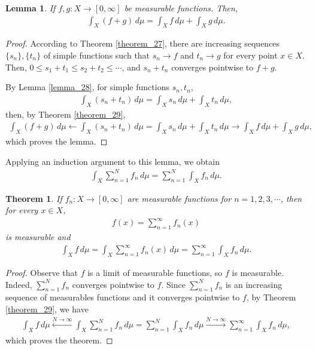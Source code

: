 \documentclass[11pt]{book}
\newtheorem{theorem}{Theorem}[chapter]
\newtheorem{lemma}{Lemma}[chapter]
\theoremstyle{definition}
\numberwithin{equation}{chapter}
\begin{document}
\begin{lemma}
If $f,g: X \to [0,\infty]$ be measurable functions. Then,
\begin{align*}
    \int_X (f + g)\,d\mu = \int_X f\,d\mu + \int_X g\,d\mu.
\end{align*}
\end{lemma}
\begin{proof}
According to Theorem \ref{theorem_27}, there are increasing sequences $\{s_n\}, \{t_n\}$ of simple functions such that $s_n \to f$ and $t_n \to g$ for every point $x \in X$. Then, $0 \leq s_1 + t_1 \leq s_2 + t_2 \leq \cdots$, and $s_n + t_n$ converges pointwise to $f + g$.

By Lemma \ref{lemma_28}, for simple functions $s_n, t_n$,
\begin{align*}
    \int_X(s_n + t_n)\,d\mu = \int_X s_n\,d\mu + \int_X t_n\,d\mu,
\end{align*}
then, by Theorem \ref{theorem_29},
\begin{align*}
    \int_X(f + g)\,d\mu \leftarrow \int_X(s_n + t_n)\,d\mu = \int_X s_n\,d\mu + \int_X t_n\,d\mu \to \int_X f\,d\mu + \int_X g\,d\mu,
\end{align*}
which proves the lemma.
\end{proof}

\medskip

Applying an induction argument to this lemma, we obtain
\begin{align*}
    \int_X \sum^N_{n=1} f_n\,d\mu = \sum^N_{n=1}\int_X f_n\,d\mu.
\end{align*}

\medskip

\begin{theorem}\label{theorem_211}
If $f_n: X \to [0,\infty]$ are measurable functions for $n = 1,2,3,\cdots$, then for every $x \in X$,
\begin{align*}
    f(x) = \sum^\infty_{n=1} f_n(x)
\end{align*}
is measurable and 
\begin{align*}
    \int_X f\,d\mu = \int_X \sum^\infty_{n=1} f_n(x)\,d\mu = \sum^\infty_{n=1} \int_X f_n\,d\mu.
\end{align*}
\end{theorem}
\begin{proof}
Observe that $f$ is a limit of measurable functions, so $f$ is measurable. Indeed, $\sum^N_{n=1} f_n$ converges pointwise to $f$. Since $\sum^N_{n=1} f_n$ is an increasing sequence of measurables functions and it converges pointwise to $f$, by Theorem \ref{theorem_29}, we have
\begin{align*}
    \int_X f\,d\mu \xleftarrow[]{N \to \infty} \int_X \sum^N_{n=1} f_n\,d\mu = \sum^N_{n=1}\int_X f_n\,d\mu \xrightarrow[]{N \to \infty} \sum^\infty_{n=1}\int_X f_n\,d\mu,
\end{align*}
which proves the theorem.
\end{proof}
\end{document}
